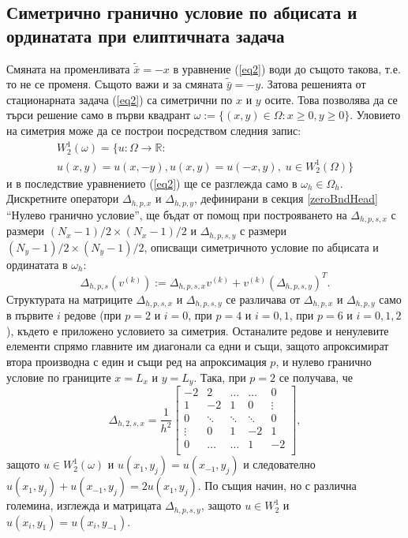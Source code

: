 \documentclass[a4paper]{article}
\newcommand{\be}{\begin{equation}}
\newcommand{\ee}{\end{equation}}
\newcommand{\rf}[1]{(\ref{#1})}
\newcommand{\RR}{\mathbb{R}}
\theoremstyle{remark}
\begin{document}
\begin{large}
\subsection{Симетрично гранично условие по абцисата и ординатата при елиптичната задача}\label{symBndHead}
Смяната на променливата $\tilde {\bar x } = -x$ в уравнение \rf{eq2} води до същото такова, т.е. то не се променя. Същото важи и за смяната $\tilde {\bar y } = -y$. Затова решенията от стационарната задача \rf{eq2} са симетрични по $x$ и $y$ осите. Това позволява да се търси решение само в първи квадрант $\omega := \{ (x,y) \in \Omega : x \geq 0, y \geq 0 \}$. Уловието на симетрия може да се построи посредством следния запис:
\begin{align}\label{funSpaceSym}
W^1_2(\omega) =\{ u : \Omega \rightarrow \RR : \nonumber \\ 
	                     u(x,y) = u(x,-y), u(x,y) = u(-x,y), \; u \in W^1_2(\Omega) \}
\end{align}
и в последствие уравнението \rf{eq2} ще се разглежда само в $\omega_h \in \Omega_h$. Дискретните оператори $\Delta_{h,p,x}$ и $\Delta_{h,p,y}$, дефинирани в секция \ref{zeroBndHead} ``Нулево гранично условие'', ще бъдат от помощ при построяването на $\Delta_{h,p,s,x}$ с размери $(N_x-1)/2 \times (N_x-1)/2$ и $\Delta_{h,p,s,y}$ с размери $(N_y-1)/2\times(N_y-1)/2$, описващи симетричното условие по абцисата и ординатата в $\omega_h$:
\be\label{PsnDiscretSym}
\Delta_{h,p,s}(v^{(k)}) := \Delta_{h,p,s,x}  v^{(k)} + v^{(k)} (\Delta_{h,p,s,y})^T.
\ee
Структурата на матриците $\Delta_{h,p,s,x}$ и $\Delta_{h,p,s,y}$ се различава от $\Delta_{h,p,x}$ и $\Delta_{h,p,y}$ само в първите $i$ редове (при $p=2$ и $i=0$, при $p=4$ и $i=0,1$, при $p=6$ и $i=0,1,2$), където е приложено условието за симетрия. Останалите редове и ненулевите елементи спрямо главните им диагонали са едни и същи, защото апроксимират втора производна с един и същи ред на апроксимация $p$, и нулево гранично условие по границите $x=L_x$ и $y=L_y$. Така, при $p=2$ се получава, че 
\[
\Delta_{h,2,s,x} = \frac{1}{h^2}
\begin{bmatrix}
    -2	       & 2        &     \dots   &   \dots        & 0   \\
    1               & -2            &   1           &   0               & \vdots    \\
        0           & \ddots        &    \ddots    &   \ddots       &  0 \\ 
    \vdots       &     0            &  1     	& -2    	   & 1 \\
    0               & \dots          &  \dots         & 1  	   & -2 \\
\end{bmatrix}
,
\]
защото $u \in W^1_2(\omega)$ и $u(x_1, y_j) = u(x_{-1}, y_j)$ и следователно $u(x_1, y_j) + u(x_{-1}, y_j) = 2 u(x_1, y_j)$. По същия начин, но с различна големина, изглежда и матрицата $\Delta_{h,p,s,y}$, защото $u \in W^1_2$ и $u(x_i, y_1) = u(x_i, y_{-1})$.  


\end{large}
\end{document}
